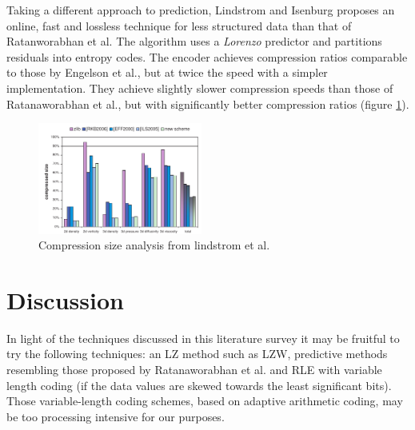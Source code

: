 \documentclass{acm_proc_article-sp}
\begin{document}
Taking a different approach to prediction, Lindstrom and Isenburg proposes an online, fast and lossless technique for less structured data than that of Ratanworabhan et al. \cite{lindstrom2006fast} The algorithm 
uses a \textit{Lorenzo} predictor and partitions residuals into entropy codes. The encoder achieves compression ratios comparable to those by Engelson et al., but at twice the speed with a simpler implementation.
They achieve slightly slower compression speeds than those of Ratanaworabhan et al., but with significantly better compression ratios (figure \ref{lindstrom}).
\begin{figure}[h]
 \centering
 \includegraphics[width=0.48\textwidth]{lindstrom.png}
 \caption{Compression size analysis from lindstrom et al. \cite{lindstrom2006fast}}
 \label{lindstrom}
\end{figure}
\section{Discussion}
In light of the techniques discussed in this literature survey it may be fruitful to try the following techniques: an LZ method such as LZW, predictive methods resembling those
proposed by Ratanaworabhan et al. and RLE with variable length coding (if the data values are skewed towards the least significant bits). Those variable-length coding schemes, based on adaptive arithmetic coding, 
may be too processing intensive for our purposes.


\end{document}
